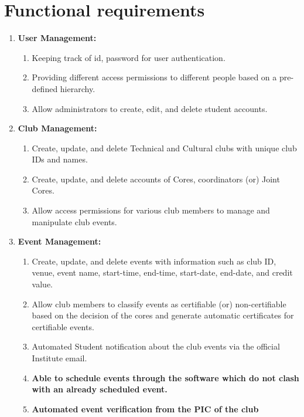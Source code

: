 \section{Functional requirements}
\begin{enumerate}
    \item \textbf{User Management:}
    \begin{enumerate}
        \item Keeping track of id, password for user authentication.
        \item Providing different access permissions to different people based on a pre-defined hierarchy.
        \item Allow administrators to create, edit, and delete student accounts.
    \end{enumerate}

    \item \textbf{Club Management: }
    \begin{enumerate}
        \item Create, update, and delete Technical and Cultural clubs with unique club IDs and names.
        \item Create, update, and delete accounts of Cores, coordinators (or) Joint Cores.
        \item Allow access permissions for various club members to manage and manipulate club events.
    \end{enumerate}

    \item \textbf{Event Management: }
    \begin{enumerate}
        \item Create, update, and delete events with information such as club ID, venue, event name, start-time, end-time, start-date, end-date, and credit value.
        \item Allow club members to classify events as certifiable (or) non-certifiable based on the decision of the cores and generate automatic certificates for certifiable events.
        \item Automated Student notification about the club events via the official Institute email.
        \item \textbf{Able to schedule events through the software which do not clash with an already scheduled event.}
        \item \textbf{Automated event verification from the PIC of the club}
    \end{enumerate}


\end{enumerate}
